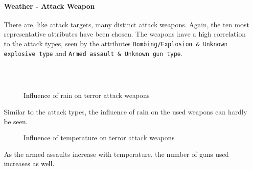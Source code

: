 \newpage

\paragraph{Weather - Attack Weapon}
There are, like attack targets, many distinct attack weapons. Again, the ten most representative attributes have been chosen. The weapons have a high correlation to the attack types, seen by the attributes \texttt{Bombing/Explosion \& Unknown explosive type} and \texttt{Armed assault \& Unknown gun type}.

\begin{figure}[!ht]
\centering
    \qquad\\
    \qquad
    \qquad\\
    \qquad
\caption{Influence of rain on terror attack weapons}
\end{figure}

Similar to the attack types, the influence of rain  on the used weapons can hardly be seen.


\newpage

\begin{figure}[!ht]
\centering
    \qquad
    \qquad
    \qquad
    \qquad
    \qquad
\caption{Influence of temperature on terror attack weapons}
\label{fig:example subfigure}
\end{figure}

As the armed assaults increase with temperature, the number of guns used increases as well.





